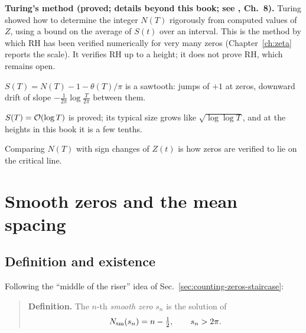 \begin{beyond}
\textbf{Turing's method (proved; details beyond this book; see \cite{edwards}, Ch.~8).} Turing showed how to determine the integer $N(T)$ rigorously from computed values of $Z$, using a bound on the average of $S(t)$ over an interval. This is the method by which RH has been verified numerically for very many zeros (Chapter~\ref{ch:zeta} reports the scale). It verifies RH up to a height; it does not prove RH, which remains open.
\end{beyond}

\begin{keyideas}
\item $S(T)=N(T)-1-\theta(T)/\pi$ is a sawtooth: jumps of $+1$ at zeros, downward drift of slope $-\frac1{2\pi}\log\frac T{2\pi}$ between them.
\item $S(T)=\mathcal{O}(\log T)$ is proved; its typical size grows like $\sqrt{\log\log T}$, and at the heights in this book it is a few tenths.
\item Comparing $N(T)$ with sign changes of $Z(t)$ is how zeros are verified to lie on the critical line.
\end{keyideas}

\section{Smooth zeros and the mean spacing}\label{sec:counting-zeros-smooth}

\subsection{Definition and existence}

Following the ``middle of the riser'' idea of Sec.~\ref{sec:counting-zeros-staircase}:

\begin{quote}
\textbf{Definition.} The $n$-th \emph{smooth zero} $s_n$ is the solution of
\begin{equation}
N_{\mathrm{sm}}(s_n)=n-\tfrac12,\qquad s_n>2\pi.
\label{eq:counting-zeros-sndef}
\end{equation}
\end{quote}

